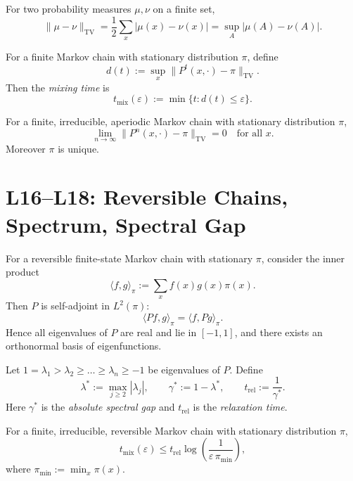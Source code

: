 \documentclass[answers,12pt,addpoints]{exam}
\begin{document}
\begin{definition}
For two probability measures $\mu,\nu$ on a finite set,
\[
\|\mu - \nu\|_{\mathrm{TV}} = \frac12 \sum_{x} |\mu(x)-\nu(x)| = \sup_{A} |\mu(A)-\nu(A)|.
\]
\end{definition}

\begin{definition}
For a finite Markov chain with stationary distribution $\pi$, define
\[
d(t) := \sup_{x} \|P^t(x,\cdot) - \pi\|_{\mathrm{TV}}.
\]
Then the \emph{mixing time} is
\[
t_{\mathrm{mix}}(\varepsilon) := \min\{t: d(t)\le \varepsilon\}.
\]
\end{definition}

\begin{theorem}
For a finite, irreducible, aperiodic Markov chain with stationary distribution $\pi$,
\[
\lim_{n\to\infty} \|P^n(x,\cdot) - \pi\|_{\mathrm{TV}} = 0 \quad \text{for all }x.
\]
Moreover $\pi$ is unique.
\end{theorem}

\section{L16–L18: Reversible Chains, Spectrum, Spectral Gap}

\begin{definition}
For a reversible finite-state Markov chain with stationary $\pi$, consider the inner product
\[
\langle f,g\rangle_\pi := \sum_{x} f(x) g(x) \pi(x).
\]
Then $P$ is self-adjoint in $L^2(\pi)$:
\[
\langle Pf,g\rangle_\pi = \langle f,Pg\rangle_\pi.
\]
Hence all eigenvalues of $P$ are real and lie in $[-1,1]$, and there exists an orthonormal basis of eigenfunctions.
\end{definition}

\begin{definition}
Let $1=\lambda_1 > \lambda_2\ge \dots \ge \lambda_n\ge -1$ be eigenvalues of $P$. Define
\[
\lambda^* := \max_{j\ge 2} |\lambda_j|, \qquad \gamma^* := 1-\lambda^*, \qquad t_{\mathrm{rel}} := \frac{1}{\gamma^*}.
\]
Here $\gamma^*$ is the \emph{absolute spectral gap} and $t_{\mathrm{rel}}$ is the \emph{relaxation time}.
\end{definition}

\begin{theorem}
For a finite, irreducible, reversible Markov chain with stationary distribution $\pi$,
\[
t_{\mathrm{mix}}(\varepsilon) \le t_{\mathrm{rel}} \log\left(\frac{1}{\varepsilon \,\pi_{\min}}\right),
\]
where $\pi_{\min} := \min_x \pi(x)$.
\end{theorem}
\end{document}
